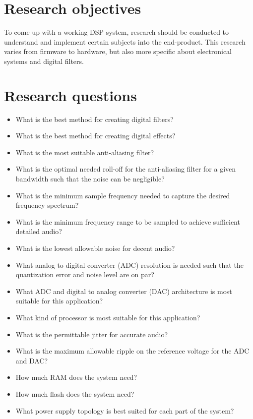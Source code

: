 \section{Research objectives}

To come up with a working DSP system, research should be conducted to understand and implement certain subjects into the end-product. This research varies from firmware to hardware, but also more specific about electronical systems and digital filters.

\section{Research questions}

\begin{itemize} %
	\setlength\itemsep{-0.3em} %
	\item What is the best method for creating digital filters?
	\item What is the best method for creating digital effects?
	\item What is the most suitable anti-aliasing filter?
	\item What is the optimal needed roll-off for the anti-aliasing filter for a given bandwidth such that the noise can be negligible?
	\item What is the minimum sample frequency needed to capture the desired frequency spectrum?
	\item What is the minimum frequency range to be sampled to achieve sufficient detailed audio?
	\item What is the lowest allowable noise for decent audio?
	\item What analog to digital converter (ADC) resolution is needed such that the quantization error and noise level are on par?
	\item What ADC and digital to analog converter (DAC) architecture is most suitable for this application?
	\item What kind of processor is most suitable for this application?
	\item What is the permittable jitter for accurate audio?
	\item What is the maximum allowable ripple on the reference voltage for the ADC and DAC?
	\item How much RAM does the system need?
	\item How much flash does the system need?
	\item What power supply topology is best suited for each part of the system?
\end{itemize}

